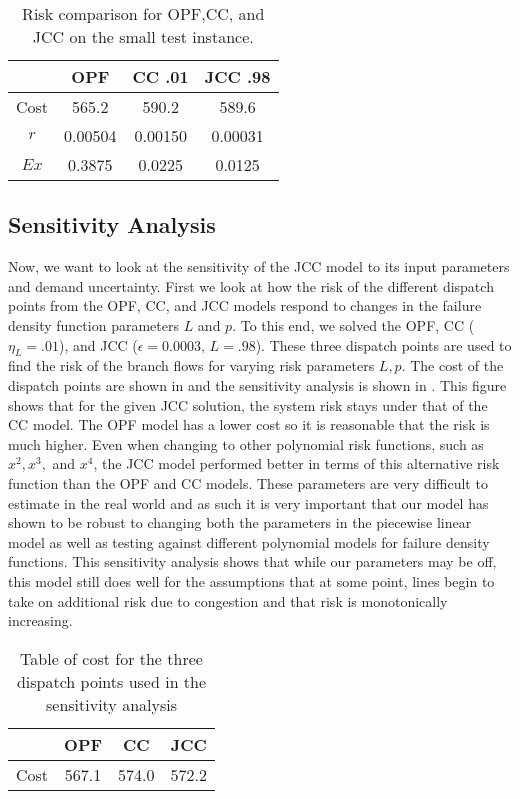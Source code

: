 \begin{table}
\centering

 \begin{tabular}{ |c| c c c |}
\hline
& OPF & CC .01 & JCC .98 \\
\hline
\hline
Cost & 565.2 & 590.2 & 589.6 \\
$r$ & 0.00504 & 0.00150 & 0.00031 \\
\hline
$Ex$ & 0.3875 & 0.0225 & 0.0125 \\
\hline
\end{tabular}
\caption{Risk comparison for OPF,CC, and JCC on the small test instance.}\label{solve_risk}
\end{table}


\subsection{Sensitivity Analysis}\label{senseanal}
Now, we want to look at the sensitivity of the JCC model to its input parameters and demand uncertainty.  First we look at how the risk of the different dispatch points from the OPF, CC, and JCC models respond to changes in the failure density function parameters $L$ and $p$.  To this end, we solved the OPF, CC ($\eta_L=.01$), and JCC ($\epsilon=0.0003$, $L=.98$).  These three dispatch points are used to find the risk of the branch flows for varying risk parameters $L,p$. The cost of the dispatch points are shown in  and the sensitivity analysis is shown in . This figure shows that for the given JCC solution, the system risk stays under that of the CC model.  The OPF model has a lower cost so it is reasonable that the risk is much higher.  Even when changing to other polynomial risk functions, such as $x^2,x^3,$ and $x^4$, the JCC model performed better in terms of this alternative risk function than the OPF and CC models.  These parameters are very difficult to estimate in the real world and as such it is very important that our model has shown to be robust to changing both the parameters in the piecewise linear model as well as testing against different polynomial models for failure density functions.  This sensitivity analysis shows that while our parameters may be off, this model still does well for the assumptions that at some point, lines begin to take on additional risk due to congestion and that risk is monotonically increasing.

\begin{table}
\centering
 \begin{tabular}{ |c| c c c |}
\hline
& OPF & CC & JCC \\
\hline
\hline
Cost & 567.1 & 574.0 & 572.2\\
\hline
\end{tabular}
\caption{Table of cost for the three dispatch points used in the sensitivity analysis}\label{tabsense}
\end{table}


